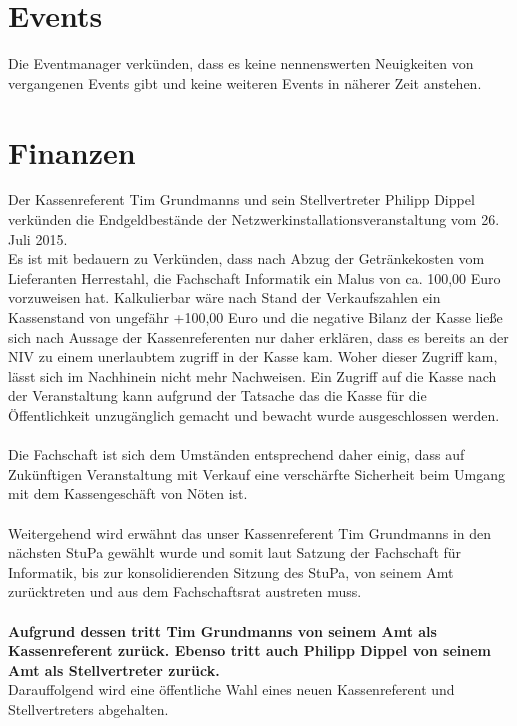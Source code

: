 \documentclass[a4paper, 11pt]{article} %
\begin{document}
\pagebreak

\section{Events}
Die Eventmanager verkünden, dass es keine nennenswerten Neuigkeiten von vergangenen Events gibt und keine weiteren Events in näherer Zeit anstehen. 

\section{Finanzen}
Der Kassenreferent Tim Grundmanns und sein Stellvertreter Philipp Dippel verkünden die Endgeldbestände der Netzwerkinstallationsveranstaltung vom 26. Juli 2015. \\ Es ist mit bedauern zu Verkünden, dass nach Abzug der Getränkekosten vom Lieferanten Herrestahl, die Fachschaft Informatik ein Malus von ca. 100,00 Euro vorzuweisen hat. Kalkulierbar wäre nach Stand der Verkaufszahlen ein Kassenstand von ungefähr +100,00 Euro und die negative Bilanz der Kasse ließe sich nach Aussage der Kassenreferenten nur daher erklären, dass es bereits an der NIV zu einem unerlaubtem zugriff in der Kasse kam. Woher dieser Zugriff kam, lässt sich im Nachhinein nicht mehr Nachweisen. Ein Zugriff auf die  Kasse nach der Veranstaltung kann aufgrund der Tatsache das die Kasse für die Öffentlichkeit unzugänglich gemacht und bewacht wurde ausgeschlossen werden.\\\\ Die Fachschaft ist sich dem Umständen entsprechend daher einig, dass auf Zukünftigen Veranstaltung mit Verkauf eine verschärfte Sicherheit beim Umgang mit dem Kassengeschäft von Nöten ist. 
\\\\
Weitergehend wird erwähnt das unser Kassenreferent Tim Grundmanns in den nächsten StuPa gewählt wurde und somit laut Satzung der Fachschaft für Informatik, bis zur konsolidierenden Sitzung des StuPa, von seinem Amt zurücktreten und aus dem Fachschaftsrat austreten muss.  
\\\\ \textbf{Aufgrund dessen tritt Tim Grundmanns von seinem Amt als Kassenreferent zurück. Ebenso tritt auch Philipp Dippel von seinem Amt als Stellvertreter zurück.}
\\

\pagebreak
\noindent Darauffolgend wird eine öffentliche Wahl eines neuen Kassenreferent und Stellvertreters abgehalten. 
\end{document}
